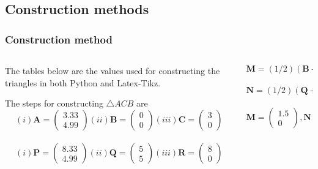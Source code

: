 \documentclass{beamer}
\renewcommand{\vec}[1]{\mathbf{#1}}
\begin{document}
\subsection*{Construction methods}
\begin{frame}[fragile]
\footnotesize
\frametitle{Construction method}
\begin{columns}
\begin{column}{0.5\textwidth}
The tables below are the values used for constructing the triangles in both Python and Latex-Tikz.
\begin{table}[htbp]
\centering
\caption{\tiny To construct $\triangle ACB$ and $\triangle PQR$}
\end{table}
The steps for constructing $\triangle ACB$ are
\newline
$$(i)\vec{A}= \begin{pmatrix}3.33\\4.99\end{pmatrix}
(ii)\vec{B}=\begin{pmatrix}0\\0\end{pmatrix}
(iii)\vec{C}=\begin{pmatrix}3\\0\end{pmatrix}$$
\\
$$(i)\vec{P}= \begin{pmatrix}8.33\\4.99\end{pmatrix}
(ii)\vec{Q}=\begin{pmatrix}5\\5\end{pmatrix}
(iii)\vec{R}=\begin{pmatrix}8\\0\end{pmatrix}$$
\end{column}
\begin{column}{0.5\textwidth}
$$\vec{M}=(1/2)(\vec{B}+\vec{C})$$
\\
$$\vec{N}=(1/2)(\vec{Q}+\vec{R})$$
\\
$$\vec{M}=\begin{pmatrix}1.5\\0\end{pmatrix},\vec{N}=\begin{pmatrix}6.5\\0\end{pmatrix}$$
\\


\end{column}
\end{columns}
\end{frame}
\end{document}
